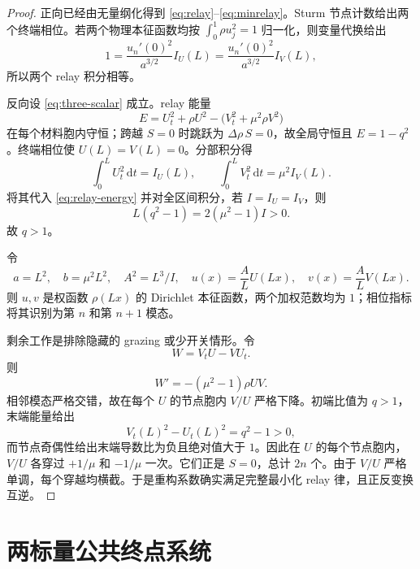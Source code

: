 \documentclass[UTF8,12pt,openany,fontset=fandol]{ctexrep}
\theoremstyle{definition}
\newcommand{\dd}{\,\mathrm d}
\begin{document}
\begin{proof}
正向已经由无量纲化得到 \eqref{eq:relay}--\eqref{eq:minrelay}。Sturm 节点计数给出两个终端相位。若两个物理本征函数均按
\(\int_0^1\rho u_j^2=1\) 归一化，则变量代换给出
\begin{equation}
 1=\frac{u_n'(0)^2}{a^{3/2}}I_U(L)
  =\frac{u_n'(0)^2}{a^{3/2}}I_V(L),
\end{equation}
所以两个 relay 积分相等。

反向设 \eqref{eq:three-scalar} 成立。relay 能量
\begin{equation}\label{eq:relay-energy}
 E=U_t^2+\rho U^2-\bigl(V_t^2+\mu^2\rho V^2\bigr)
\end{equation}
在每个材料胞内守恒；跨越 $S=0$ 时跳跃为 $\Delta\rho\,S=0$，故全局守恒且 $E=1-q^2$。终端相位使 $U(L)=V(L)=0$。分部积分得
\begin{equation}
 \int_0^L U_t^2\dd t=I_U(L),\qquad
 \int_0^L V_t^2\dd t=\mu^2 I_V(L).
\end{equation}
将其代入 \eqref{eq:relay-energy} 并对全区间积分，若 $I=I_U=I_V$，则
\begin{equation}\label{eq:qgreater1}
 L(q^2-1)=2(\mu^2-1)I>0.
\end{equation}
故 $q>1$。

令
\begin{equation}
 a=L^2,\quad b=\mu^2L^2,\quad A^2=L^3/I,\quad
 u(x)=\frac{A}{L}U(Lx),\quad v(x)=\frac{A}{L}V(Lx).
\end{equation}
则 $u,v$ 是权函数 $\rho(Lx)$ 的 Dirichlet 本征函数，两个加权范数均为 $1$；相位指标将其识别为第 $n$ 和第 $n+1$ 模态。

剩余工作是排除隐藏的 grazing 或少开关情形。令
\begin{equation}
 W=V_tU-VU_t.
\end{equation}
则
\begin{equation}
 W'=-(\mu^2-1)\rho UV.
\end{equation}
相邻模态严格交错，故在每个 $U$ 的节点胞内 $V/U$ 严格下降。初端比值为 $q>1$，末端能量给出
\begin{equation}
 V_t(L)^2-U_t(L)^2=q^2-1>0,
\end{equation}
而节点奇偶性给出末端导数比为负且绝对值大于 $1$。因此在 $U$ 的每个节点胞内，$V/U$ 各穿过 $+1/\mu$ 和 $-1/\mu$ 一次。它们正是 $S=0$，总计 $2n$ 个。由于 $V/U$ 严格单调，每个穿越均横截。于是重构系数确实满足完整最小化 relay 律，且正反变换互逆。
\end{proof}

\section{两标量公共终点系统}
\end{document}
